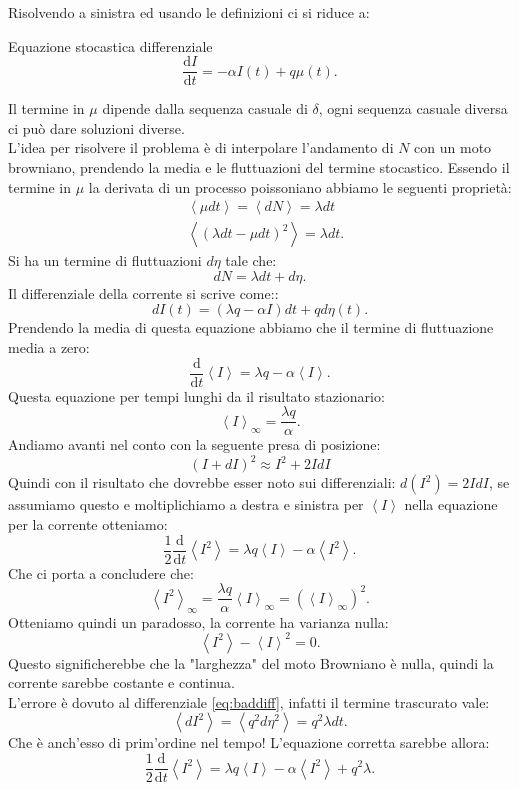 Risolvendo a sinistra ed usando le definizioni ci si riduce a:
\begin{redbox}{Equazione stocastica differenziale}
 \[
    \frac{\text{d} I}{\text{d} t} = -\alpha I(t) + q\mu (t) 
.\]    
\end{redbox}
Il termine in $\mu$ dipende dalla sequenza casuale di $\delta$, ogni sequenza casuale diversa ci può dare soluzioni diverse.\\
L'idea per risolvere il problema è di interpolare l'andamento di $N$ con un moto browniano, prendendo la media e le fluttuazioni del termine stocastico.
Essendo il termine in $\mu$ la derivata di un processo poissoniano abbiamo le seguenti proprietà:
\[\begin{aligned}
    &\left<\mu dt\right>=\left<dN\right> = \lambda dt\\
    & \left<\left(\lambda dt - \mu dt\right)^2\right> = \lambda dt
.\end{aligned}\]
Si ha un termine di fluttuazioni $d\eta$ tale che:
\[
    dN = \lambda dt + d\eta	
.\] 
Il differenziale della corrente si scrive come::
\[
    dI(t) = \left(\lambda q-\alpha I\right)dt+ qd\eta (t) 
.\] 
Prendendo la media di questa equazione abbiamo che il termine di fluttuazione media a zero:
\[
    \frac{\text{d} }{\text{d} t} \left<I\right> = \lambda q -\alpha\left<I\right>
.\] 
Questa equazione per tempi lunghi da il risultato stazionario:
\[
    \left<I\right>_{\infty}=\frac{\lambda q}{\alpha}
.\] 
Andiamo avanti nel conto con la seguente presa di posizione:
\begin{equation}
    \left(I+dI\right)^2 \approx I^2 + 2IdI	\label{eq:baddiff}
\end{equation}
Quindi con il risultato che dovrebbe esser noto sui differenziali: $d\left(I^2\right) = 2IdI$, se assumiamo questo e moltiplichiamo a destra e sinistra per $\left<I\right>$ nella equazione   per la corrente otteniamo:
\[
    \frac{1}{2}\frac{\text{d} }{\text{d} t} \left<I^2\right>= \lambda q\left<I\right>-\alpha\left<I^2\right>
.\] 
Che ci porta a concludere che:
\[
    \left<I^2\right>_{\infty} = \frac{\lambda q}{\alpha}\left<I\right>_{\infty} = \left(\left<I\right>_{\infty}\right)^2
.\] 
Otteniamo quindi un paradosso, la corrente ha varianza nulla:
\[
  \left<I^2\right>-\left<I\right>^2 = 0  
.\] 
Questo significherebbe che la "larghezza" del moto Browniano è nulla, quindi la corrente sarebbe costante e continua.\\
L'errore è dovuto al differenziale \ref{eq:baddiff}, infatti il termine trascurato vale:
\[
    \left<dI^2\right> = \left<q^2d\eta^2\right> = q^2\lambda dt
.\] 
Che è anch'esso di prim'ordine nel tempo! L'equazione corretta sarebbe allora:
\[
    \frac{1}{2}\frac{\text{d} }{\text{d} t} \left<I^2\right>= \lambda q\left<I\right>-\alpha\left<I^2\right> + q^2\lambda
.\]
